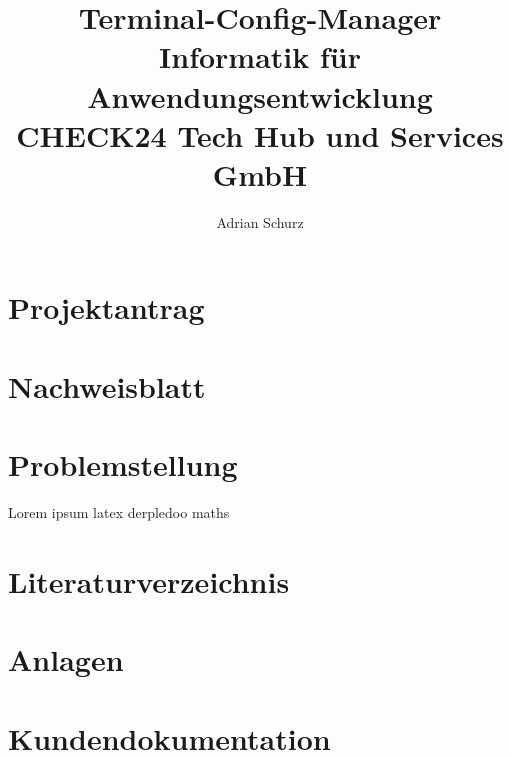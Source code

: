\documentclass[a4paper,11pt]{scrartcl} %
\author{Adrian Schurz}
\title{Terminal-Config-Manager\\
	Informatik für Anwendungsentwicklung\\
	CHECK24 Tech Hub und Services GmbH\\
	}
\begin{document}

\maketitle
{}
\newpage

\section{Projektantrag}


\section{Nachweisblatt}
\paragraph{}

\newpage
\tableofcontents
\newpage


\section{Problemstellung}
Lorem ipsum \gls{latex} derpledoo \gls{maths}

\section{Literaturverzeichnis}

\section{Anlagen}

\section{Kundendokumentation}











\printglossaries
\end{document}
